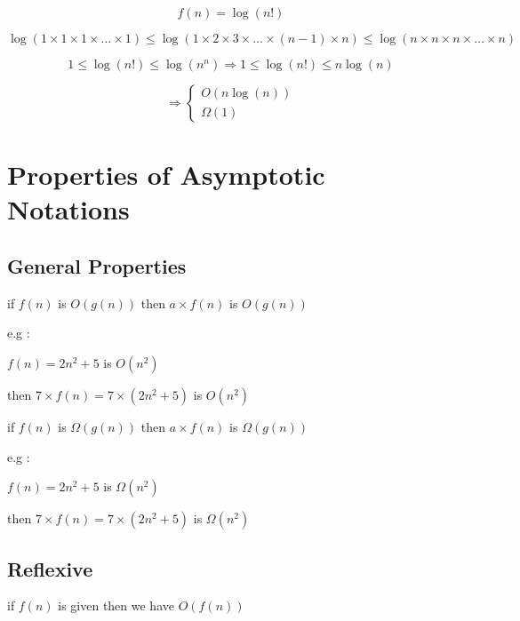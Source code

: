 \documentclass[12pt]{article}
\begin{document}
$$
f(n) = \log{(n!)}
$$


$$
\log{(1 \times 1 \times 1 \times \dots \times 1)}
\leq 
\log{(1 \times 2 \times 3 \times \dots \times (n-1) \times n) }
\leq
\log{(n \times n \times n \times \dots \times n) }
$$



$$
1 \leq \log{(n!)} \leq \log{(n^{n})} \Rightarrow 1 \leq \log{(n!)} \leq n\log{(n)}
$$



$$
\Rightarrow \begin{cases}
O(n\log{(n)}) 
\\
\Omega(1)
\end{cases}
$$


\newpage


\section{Properties of Asymptotic Notations}



\subsection{General Properties}

\begin{tcolorbox}
if 
$f(n)$
 is 
$O(g(n))$
then
$a \times f(n)$
 is 
$O(g(n))$
\end{tcolorbox}

e.g : 

$f(n) = 2n^{2} + 5$
is
$O(n^{2})$

then 
$7 \times f(n) = 7 \times (2n^{2} + 5)$
is
$O(n^{2})$


\begin{tcolorbox}
if 
$f(n)$
 is 
$\Omega(g(n))$
then
$a \times f(n)$
 is 
$\Omega(g(n))$
\end{tcolorbox}


e.g : 

$f(n) = 2n^{2} + 5$
is
$\Omega(n^{2})$

then 
$7 \times f(n) = 7 \times (2n^{2} + 5)$
is
$\Omega(n^{2})$

\subsection{Reflexive}

\begin{tcolorbox}
if
$f(n)$
is given 
then we have
$O(f(n))$
\end{tcolorbox}
\end{document}
